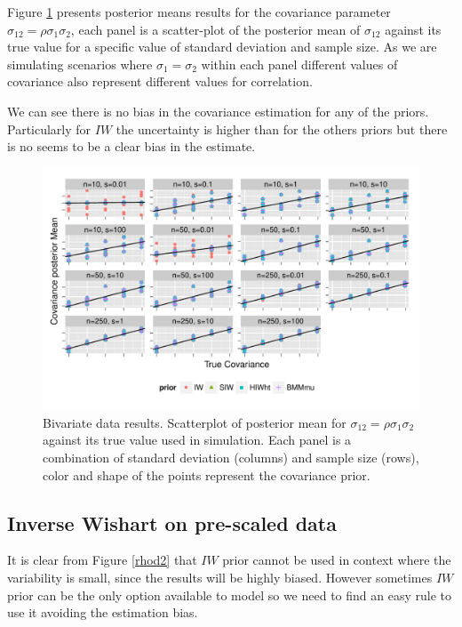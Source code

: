 \documentclass[a4paper]{article}
\begin{document}
Figure \ref{devCov} presents posterior means results for the covariance parameter $\sigma_{12}=\rho\sigma_1\sigma_2$, each panel is a scatter-plot of the posterior mean of $\sigma_{12}$ against its true value for a specific value of standard deviation and sample size. As we are simulating scenarios where $\sigma_1 = \sigma_2$ within each panel different values of covariance also represent different values for correlation. 

We can see there is no bias in the covariance estimation for any of the priors. Particularly for $IW$ the uncertainty is higher than for the others priors but there is no seems to be a clear bias in the estimate. 
\begin{figure}[htbp]
   \centering
   \includegraphics[width=\textwidth]{fig_cov_d2} 
    \vspace{-.5in}
   \caption{Bivariate data results. Scatterplot of posterior mean for $\sigma_{12}=\rho\sigma_1\sigma_2$  against its true value used in simulation. Each panel is a combination of standard deviation (columns) and sample size (rows),  color and shape of the points represent the covariance prior. \label{devCov} }
\end{figure}

\subsection{Inverse Wishart on pre-scaled data}

It is clear from Figure \ref{rhod2} that $IW$ prior cannot be used in context where the variability is small, since the results will be highly biased. However sometimes $IW$ prior can be the only option available to model so we need to find an easy rule to use it avoiding the estimation bias. 
\end{document}
